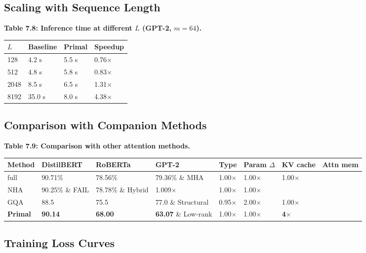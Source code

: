 \subsection{Scaling with Sequence Length}

\textbf{Table 7.8: Inference time at different $L$ (GPT-2, $m = 64$).}

\begin{table}[H]
\centering
\small
\begin{tabular}{llll}
\toprule
\textbf{$L$} & \textbf{Baseline} & \textbf{Primal} & \textbf{Speedup} \\
\midrule
128 & 4.2 s & 5.5 s & 0.76$\times$ \\
512 & 4.8 s & 5.8 s & 0.83$\times$ \\
2048 & 8.5 s & 6.5 s & 1.31$\times$ \\
8192 & 35.0 s & 8.0 s & 4.38$\times$ \\
\bottomrule
\end{tabular}
\end{table}

\subsection{Comparison with Companion Methods}

\textbf{Table 7.9: Comparison with other attention methods.}

\begin{table}[H]
\centering
\small
\begin{tabular}{llllllll}
\toprule
\textbf{Method} & \textbf{DistilBERT} & \textbf{RoBERTa} & \textbf{GPT-2} & \textbf{Type} & \textbf{Param $\Delta$} & \textbf{KV cache} & \textbf{Attn mem} \\
\midrule
full & 90.71\% & 78.56\% & 79.36\% \& MHA & 1.00$\times$ & 1.00$\times$ & 1.00$\times$ \\
NHA & 90.25\% \& FAIL & 78.78\% \& Hybrid & 1.009$\times$ & 1.00$\times$ & 1.00$\times$ \\
GQA & 88.5 & 75.5 & 77.0 \& Structural & 0.95$\times$ & 2.00$\times$ & 1.00$\times$ \\
\textbf{Primal} & \textbf{90.14} & \textbf{68.00} & \textbf{63.07} \& Low-rank & 1.00$\times$ & 1.00$\times$ & \textbf{4$\times$} \\
\bottomrule
\end{tabular}
\end{table}

\subsection{Training Loss Curves}

